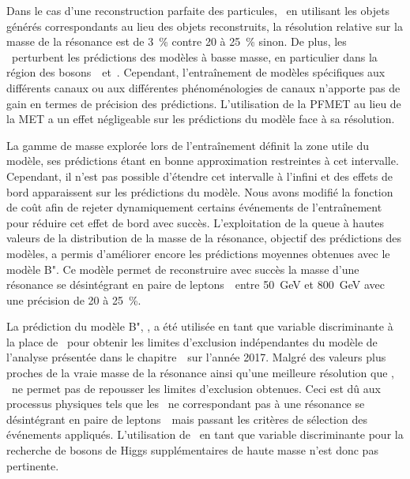 Dans le cas d'une reconstruction parfaite des particules,
\ie\ en utilisant les objets générés correspondants au lieu des objets reconstruits,
la résolution relative sur la masse de la résonance est de \SI{3}{\%}
contre \num{20} à \SI{25}{\%} sinon.
De plus, les \ftauhs\ perturbent les prédictions des modèles à basse masse,
en particulier dans la région des bosons~\Zboson\ et~\higgs.
Cependant, l'entraînement de modèles spécifiques aux différents canaux ou aux différentes phénoménologies de canaux n'apporte pas de gain en termes de précision des prédictions.
L'utilisation de la PFMET au lieu de la \PUPPI MET a un effet négligeable sur les prédictions du modèle face à sa résolution.
\par
La gamme de masse explorée lors de l'entraînement définit la zone utile du modèle, ses prédictions étant en bonne approximation restreintes à cet intervalle.
Cependant, il n'est pas possible d'étendre cet intervalle à l'infini
et des effets de bord apparaissent sur les prédictions du modèle.
Nous avons modifié la fonction de coût afin de rejeter dynamiquement certains événements de l'entraînement pour réduire cet effet de bord avec succès.
L'exploitation de la queue à hautes valeurs de la distribution de la masse de la résonance, objectif des prédictions des modèles,
a permis d'améliorer encore les prédictions moyennes obtenues avec le modèle B".
Ce modèle permet de reconstruire avec succès la masse d'une résonance se désintégrant en paire de leptons~\tau\
entre \SI{50}{\GeV} et \SI{800}{\GeV} avec une précision de \num{20} à \SI{25}{\%}.
\par
La prédiction du modèle B", \mml, a été utilisée en tant que variable discriminante à la place de \mTtot\ pour obtenir les limites d'exclusion indépendantes du modèle de l'analyse présentée dans le chapitre~\ sur l'année 2017.
Malgré des valeurs plus proches de la vraie masse de la résonance
ainsi qu'une meilleure résolution que \mTtot, \mml\
ne permet pas de repousser les limites d'exclusion obtenues.
Ceci est dû aux processus physiques tels que les \ftauhs\ ne correspondant pas à une résonance se désintégrant en paire de leptons~\tau\
mais passant les critères de sélection des événements appliqués.
L'utilisation de \mml\ en tant que variable discriminante pour la recherche de bosons de Higgs supplémentaires de haute masse n'est donc pas pertinente.
